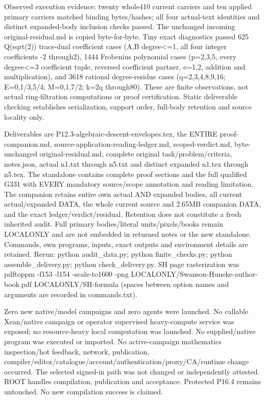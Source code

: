 Observed execution evidence: twenty whole410 current carriers and ten applied primary carriers matched binding bytes/hashes; all four actual-text identities and distinct expanded-body inclusion checks passed. The unchanged incoming original-residual.md is copied byte-for-byte. Tiny exact diagnostics passed 625 Q(sqrt(2)) trace-dual coefficient cases (A,B degree\textless{}=1, all four integer coefficients -2 through2), 1444 Frobenius polynomial cases (p=2,3,5, every degree\textless{}=3 coefficient tuple, reversed coefficient partner, e=1,2, addition and multiplication), and 3618 rational degree-residue cases (q=2,3,4,8,9,16; E=0,1/3,5/4; M=0,1,7/2; k=2q through80). These are finite observations, not actual ring-filtration computations or proof certification. Static deliverable checking establishes serialization, support order, full-body retention and source locality only.

Deliverables are P12.3-algebraic-descent-envelopes.tex, the ENTIRE proof-companion.md, source-application-reading-ledger.md, scoped-verdict.md, byte-unchanged original-residual.md, complete original task/problem/criteria, notes.json, actual n1.txt through n5.txt and distinct expanded n1.tex through n5.tex. The standalone contains complete proof sections and the full qualified G331 with EVERY mandatory source/scope annotation and reading limitation. The companion retains entire own actual AND expanded bodies, all current actual/expanded DATA, the whole current source and 2.65MB companion DATA, and the exact ledger/verdict/residual. Retention does not constitute a fresh inherited audit. Full primary bodies/literal units/pixels/books remain LOCALONLY and are not embedded in returned notes or the new standalone. Commands, own programs, inputs, exact outputs and environment details are retained. Rerun: python audit\_data.py; python finite\_checks.py; python assemble\_delivery.py; python check\_delivery.py. SH page rasterization was pdftoppm -f153 -l154 -scale-to1600 -png LOCALONLY/Swanson-Huneke-author-book.pdf LOCALONLY/SH-formula (spaces between option names and arguments are recorded in commands.txt).

Zero new native/model campaigns and zero agents were launched. No callable Xean/native campaign or operator supervised heavy-compute service was exposed; no resource-heavy local computation was launched. No supplied/native program was executed or imported. No active-campaign mathematics inspection/hot feedback, network, publication, compiler/editor/catalogue/account/authentication/proxy/CA/runtime change occurred. The selected signed-in path was not changed or independently attested. ROOT handles compilation, publication and acceptance. Protected P16.4 remains untouched. No new compilation success is claimed.

